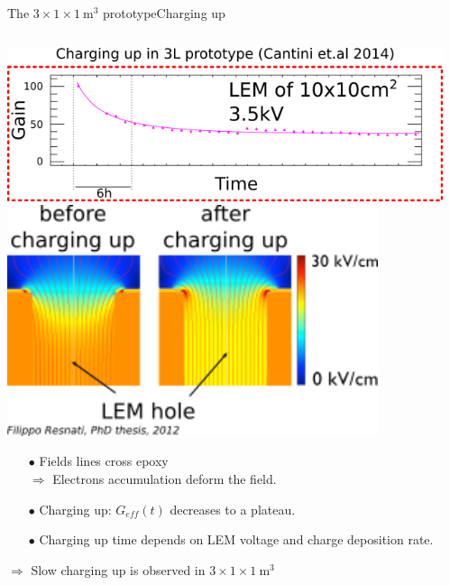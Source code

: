 \documentclass[10pt]{beamer}
\begin{document}
    \begin{frame}{The \texorpdfstring{$3 \times 1 \times \SI{1}{\meter\cubed}$}{311} prototype}{Charging up}
    	\begin{scriptsize}
    		\begin{columns}
    			\begin{column}{0.45\textwidth}
    				\includegraphics[width=\textwidth]{figures/311/3L_charging_up.png}\\
    				\vspace{0.1cm}
    				\includegraphics[width=0.85\textwidth]{figures/311/CU.png}\\
    				\begin{itemize}
    					\item[$\bullet$] Fields lines  cross epoxy\\
    					$\Rightarrow$ Electrons accumulation deform the field.
    					\item[$\bullet$] Charging up: $G_{eff}(t)$ decreases to a plateau.
    					\item[$\bullet$] Charging up time depends on LEM voltage and charge deposition rate.
    				\end{itemize}
    				$\Rightarrow$ Slow charging up is observed in $3 \times 1 \times \SI{1}{\meter\cubed}$ 
    			\end{column}\hfill
    			\begin{column}{0.55\textwidth}

\end{column}
\end{columns}
\end{scriptsize}
\end{frame}
\end{document}
